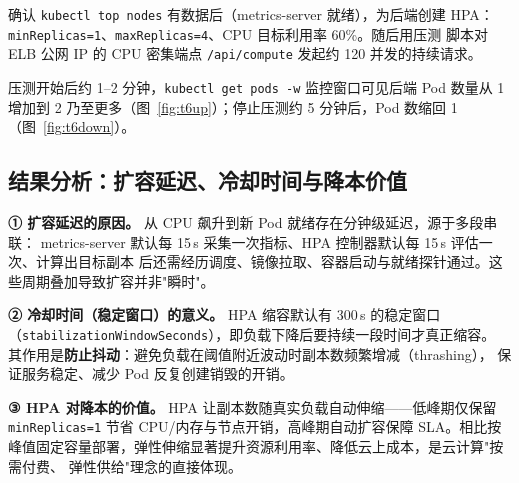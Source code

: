 确认 \lstinline!kubectl top nodes! 有数据后（metrics-server 就绪），为后端创建 HPA：
\lstinline!minReplicas=1!、\lstinline!maxReplicas=4!、CPU 目标利用率 60\%。随后用压测
脚本对 ELB 公网 IP 的 CPU 密集端点 \lstinline!/api/compute! 发起约 120 并发的持续请求。


压测开始后约 1--2 分钟，\lstinline!kubectl get pods -w! 监控窗口可见后端 Pod 数量从 1
增加到 2 乃至更多（图~\ref{fig:t6up}）；停止压测约 5 分钟后，Pod 数缩回 1
（图~\ref{fig:t6down}）。


\subsection{结果分析：扩容延迟、冷却时间与降本价值}

\textbf{① 扩容延迟的原因。} 从 CPU 飙升到新 Pod 就绪存在分钟级延迟，源于多段串联：
metrics-server 默认每 15\,s 采集一次指标、HPA 控制器默认每 15\,s 评估一次、计算出目标副本
后还需经历调度、镜像拉取、容器启动与就绪探针通过。这些周期叠加导致扩容并非"瞬时"。

\textbf{② 冷却时间（稳定窗口）的意义。} HPA 缩容默认有 300\,s 的稳定窗口
（\lstinline!stabilizationWindowSeconds!），即负载下降后要持续一段时间才真正缩容。
其作用是\textbf{防止抖动}：避免负载在阈值附近波动时副本数频繁增减（thrashing），
保证服务稳定、减少 Pod 反复创建销毁的开销。

\textbf{③ HPA 对降本的价值。} HPA 让副本数随真实负载自动伸缩——低峰期仅保留
\lstinline!minReplicas=1! 节省 CPU/内存与节点开销，高峰期自动扩容保障 SLA。相比按
峰值固定容量部署，弹性伸缩显著提升资源利用率、降低云上成本，是云计算"按需付费、
弹性供给"理念的直接体现。
